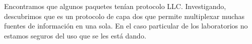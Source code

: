 Encontramos que algunos paquetes tenían protocolo LLC. Investigando, descubrimos
que es un protocolo de capa dos que permite multiplexar muchas fuentes de
información en una sola. En el caso particular de los laboratorios no
estamos seguros del uso que se les está dando.

